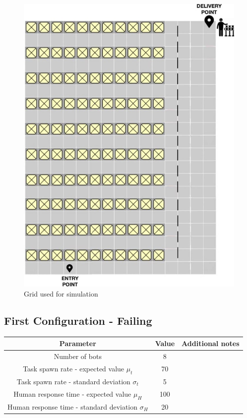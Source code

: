 \documentclass[10pt,a4paper]{article}
\begin{document}
			\begin{figure}[ht]
				\centering
					\includegraphics[scale = 0.4]{Images/Grid.jpg}
					\caption{Grid used for simulation}
			\end{figure}

		
		
		\subsection{First Configuration - Failing}
			\begin{center}
				\begin{tabular}{ |c|c|c|}
					\hline
					Parameter & Value & Additional notes\\
					\hline
					\hline
					Number of bots & 8 &\\
					\hline
					Task spawn rate - expected value $\mu_t$ & 70 &\\
					\hline					
					Task spawn rate - standard deviation $\sigma_t$ & 5 &\\
					\hline
					Human response time - expected value $\mu_H$ & 100 &\\
					\hline					
					Human response time - standard deviation $\sigma_H$ & 20 &\\
					\hline
				\end{tabular}
			\end{center}
		
\end{document}

